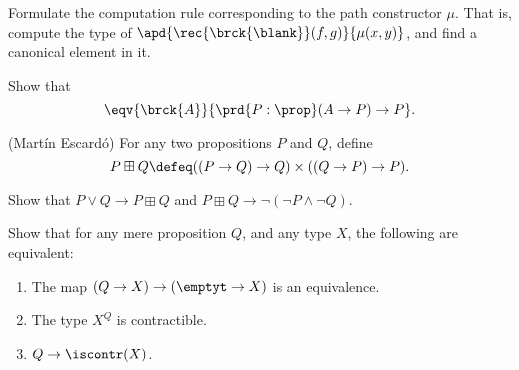 \begin{exercises}
\item \label{ex:brck_comp} Formulate the computation rule corresponding to the path constructor $\mu$. That is, compute the type of $\apd{\rec{\brck{\blank}}(f,g)}{\mu(x,y)}$, and find a canonical element in it.
\item Show that
\begin{equation*}
\eqv{\brck{A}}{\prd{P:\prop}(A\to P)\to P}.
\end{equation*}
\item \label{also}(Mart\'in Escard\'o) For any two propositions $P$ and $Q$, define
\begin{equation*}
P\boxplus Q \defeq ((P\to Q)\to Q)\times ((Q\to P)\to P).
\end{equation*}
\begin{subexenum}
\item Show that $P\lor Q\to P\boxplus Q$ and $P\boxplus Q\to\neg(\neg P\land \neg Q)$.
\end{subexenum}
\item Show that for any mere proposition $Q$, and any type $X$, the following are equivalent:
\begin{enumerate}
\item The map $(Q\to X)\to(\emptyt\to X)$ is an equivalence.
\item The type $X^Q$ is contractible.
\item $Q\to\iscontr(X)$.
\end{enumerate}
\end{exercises}

